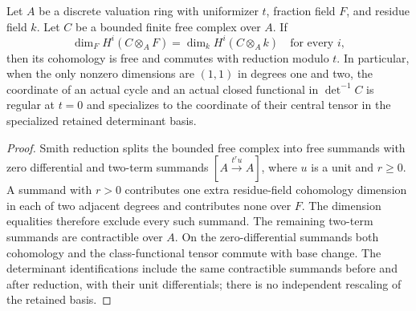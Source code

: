 \begin{lemma}
\label{lem:v10-determinant-specialization}
Let $A$ be a discrete valuation ring with uniformizer $t$, fraction
field $F$, and residue field $k$. Let $C$ be a bounded finite free
complex over $A$. If
\[
 \dim_F H^i(C\otimes_A F)=\dim_k H^i(C\otimes_A k)
 \quad\text{for every }i,
\]
then its cohomology is free and commutes with reduction modulo $t$.
In particular, when the only nonzero dimensions are $(1,1)$ in
degrees one and two, the coordinate of an actual cycle and an actual
closed functional in $\det^{-1}C$ is regular at $t=0$ and specializes
to the coordinate of their central tensor in the specialized retained
determinant basis.
\end{lemma}
\begin{proof}
Smith reduction splits the bounded free complex into free summands with
zero differential and two-term summands $[A\xrightarrow{t^r u}A]$,
where $u$ is a unit and $r\ge0$. A summand with $r>0$ contributes
one extra residue-field cohomology dimension in each of two adjacent
degrees and contributes none over $F$. The dimension equalities
therefore exclude every such summand. The remaining two-term summands
are contractible over $A$. On the zero-differential summands both
cohomology and the class-functional tensor commute with base change.
The determinant identifications include the same contractible
summands before and after reduction, with their unit differentials;
there is no independent rescaling of the retained basis.
\end{proof}

